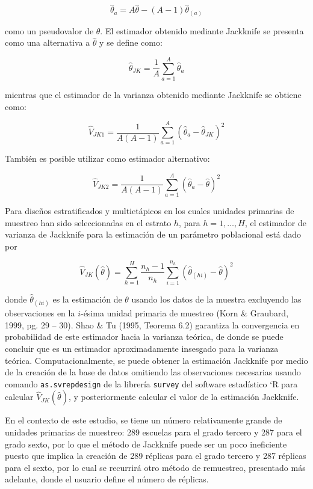 \[\hat{\theta}_{a}=A\hat{\theta}-(A-1)\hat{\theta}_{(a)}\]

como un pseudovalor de \(\theta\). El estimador obtenido mediante Jackknife se presenta como una alternativa a \(\hat{\theta}\) y se define como:

\[\hat{\theta}_{JK}=\dfrac{1}{A}\sum_{a=1}^{A}\hat{\theta}_{a}\]

mientras que el estimador de la varianza obtenido mediante Jackknife se obtiene como:

\[\hat{V}_{JK1}=\dfrac{1}{A(A-1)}\sum_{a=1}^{A}\left(\hat{\theta}_{a}-\hat{\theta}_{JK}\right)^{2}\]

También es posible utilizar como estimador alternativo:

\[\hat{V}_{JK2}=\dfrac{1}{A(A-1)}\sum_{a=1}^{A}\left(\hat{\theta}_{a}-\hat{\theta}\right)^{2}\]

Para diseños estratificados y multietápicos en los cuales unidades primarias de muestreo han sido seleccionadas en el estrato \(h\), para \(h=1, \ldots, H\), el estimador de varianza de Jackknife para la estimación de un parámetro poblacional está dado por

\[ \hat{V}_{JK}(\hat{\theta}) = \sum_{h=1}^H \frac{n_h - 1}{n_h} \sum_{i=1}^{n_h}
(\hat{\theta}_{(hi)}-\hat{\theta})^2\]

donde \(\hat{\theta}_{(hi)}\) es la estimación de \(\theta\) usando los datos de la muestra excluyendo las observaciones en la \(i\)-ésima unidad primaria de muestreo (Korn \& Graubard, 1999, pg. 29 -- 30). Shao \& Tu (1995, Teorema 6.2) garantiza la convergencia en probabilidad de este estimador hacia la varianza teórica, de donde se puede concluir que es un estimador aproximadamente insesgado para la varianza teórica. Computacionalmente, se puede obtener la estimación Jackknife por medio de la creación de la base de datos omitiendo las observaciones necesarias usando comando \texttt{as.svrepdesign} de la librería \texttt{survey} del software estadístico `R para calcular \(\hat{V}_{JK}(\hat{\theta})\), y posteriormente calcular el valor de la estimación Jackknife.

En el contexto de este estudio, se tiene un número relativamente grande de unidades primarias de muestreo: 289 escuelas para el grado tercero y 287 para el grado sexto, por lo que el método de Jackknife puede ser un poco ineficiente puesto que implica la creación de 289 réplicas para el grado tercero y 287 réplicas para el sexto, por lo cual se recurrirá otro método de remuestreo, presentado más adelante, donde el usuario define el número de réplicas.

